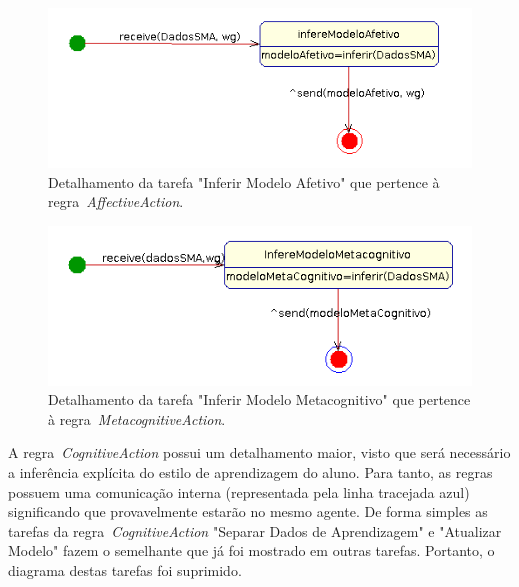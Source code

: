 \begin{figure}
	\centering
	\includegraphics[scale=0.48]{images/td-inferir-afetivo.png}
	\caption{Detalhamento da tarefa "Inferir Modelo Afetivo" que pertence à regra~\emph{AffectiveAction}.}
	\label{fig:td-inferir-afetivo}
\end{figure}

\begin{figure}
	\centering
	\includegraphics[scale=0.48]{images/td-inferir-metacognitivo.png}
	\caption{Detalhamento da tarefa "Inferir Modelo Metacognitivo" que pertence à regra~\emph{MetacognitiveAction}.}
	\label{fig:td-inferir-metacognitivo}
\end{figure}

A regra~\emph{CognitiveAction} possui um detalhamento maior, visto que será necessário a inferência explícita do estilo de aprendizagem do aluno. Para tanto, as regras possuem uma comunicação interna (representada pela linha tracejada azul) significando que provavelmente estarão no mesmo agente. De forma simples as tarefas da regra~\emph{CognitiveAction} "Separar Dados de Aprendizagem" e "Atualizar Modelo" fazem o semelhante que já foi mostrado em outras tarefas. Portanto, o diagrama destas tarefas foi suprimido.

